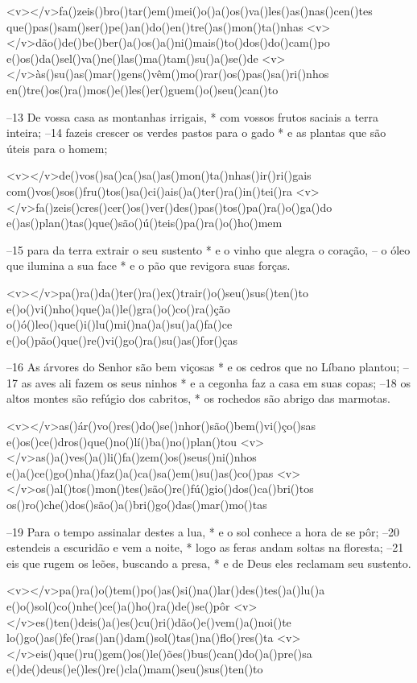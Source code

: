 <v></v>fa()zeis()bro()tar()em()mei()o()a()os()va()les()as()nas()cen()tes
que()pas()sam()ser()pe()an()do()en()tre()as()mon()ta()nhas
<v></v>dão()de()be()ber()a()os()a()ni()mais()to()dos()do()cam()po
e()os()da()sel()va()ne()las()ma()tam()su()a()se()de
<v></v>às()su()as()mar()gens()vêm()mo()rar()os()pas()sa()ri()nhos
en()tre()os()ra()mos()e()les()er()guem()o()seu()can()to

–13 De vossa casa as montanhas irrigais, *
com vossos frutos saciais a terra inteira;
–14 fazeis crescer os verdes pastos para o gado *
e as plantas que são úteis para o homem;

<v></v>de()vos()sa()ca()sa()as()mon()ta()nhas()ir()ri()gais
com()vos()sos()fru()tos()sa()ci()ais()a()ter()ra()in()tei()ra
<v></v>fa()zeis()cres()cer()os()ver()des()pas()tos()pa()ra()o()ga()do
e()as()plan()tas()que()são()ú()teis()pa()ra()o()ho()mem

–15 para da terra extrair o seu sustento *
e o vinho que alegra o coração,
– o óleo que ilumina a sua face *
e o pão que revigora suas forças.

<v></v>pa()ra()da()ter()ra()ex()trair()o()seu()sus()ten()to
e()o()vi()nho()que()a()le()gra()o()co()ra()ção
o()ó()leo()que()i()lu()mi()na()a()su()a()fa()ce
e()o()pão()que()re()vi()go()ra()su()as()for()ças

–16 As árvores do Senhor são bem viçosas *
e os cedros que no Líbano plantou;
–17 as aves ali fazem os seus ninhos *
e a cegonha faz a casa em suas copas;
–18 os altos montes são refúgio dos cabritos, *
os rochedos são abrigo das marmotas.

<v></v>as()ár()vo()res()do()se()nhor()são()bem()vi()ço()sas
e()os()ce()dros()que()no()lí()ba()no()plan()tou
<v></v>as()a()ves()a()li()fa()zem()os()seus()ni()nhos
e()a()ce()go()nha()faz()a()ca()sa()em()su()as()co()pas
<v></v>os()al()tos()mon()tes()são()re()fú()gio()dos()ca()bri()tos
os()ro()che()dos()são()a()bri()go()das()mar()mo()tas

–19 Para o tempo assinalar destes a lua, *
e o sol conhece a hora de se pôr;
–20 estendeis a escuridão e vem a noite, *
logo as feras andam soltas na floresta;
–21 eis que rugem os leões, buscando a presa, *
e de Deus eles reclamam seu sustento.

<v></v>pa()ra()o()tem()po()as()si()na()lar()des()tes()a()lu()a
e()o()sol()co()nhe()ce()a()ho()ra()de()se()pôr
<v></v>es()ten()deis()a()es()cu()ri()dão()e()vem()a()noi()te
lo()go()as()fe()ras()an()dam()sol()tas()na()flo()res()ta
<v></v>eis()que()ru()gem()os()le()ões()bus()can()do()a()pre()sa
e()de()deus()e()les()re()cla()mam()seu()sus()ten()to

